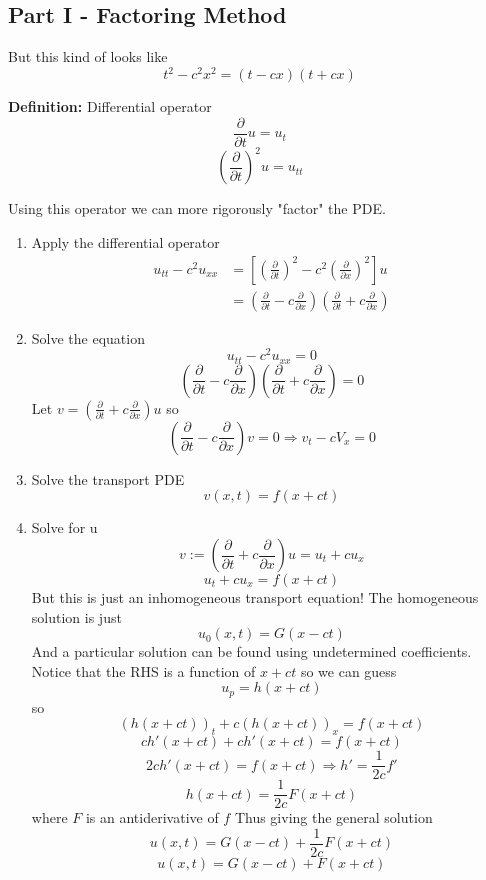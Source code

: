 \documentclass[12pt]{article}
\begin{document}
\subsection*{Part I - Factoring Method}
But this kind of looks like 
\[t^2 - c^2 x^2 = (t - cx)(t + cx)\]

\textbf{Definition:} Differential operator
\[\frac{\partial}{\partial t} u = u_t\]
\[\left(\frac{\partial}{\partial t}\right)^2 u = u_{tt}\]

Using this operator we can more rigorously "factor" the PDE.

\begin{enumerate}
    \item Apply the differential operator 
    \begin{align*}
        u_{tt} - c^2 u_{xx} &= \left[\left(\frac{\partial}{\partial t}\right)^2 - c^2 \left(\frac{\partial}{\partial x}\right)^2\right]u\\
        &= \left(\frac{\partial}{\partial t} - c \frac{\partial}{\partial x}\right)\left(\frac{\partial}{\partial t} + c \frac{\partial}{\partial x}\right)
    \end{align*}
    \item Solve the equation 
    \[u_{tt} - c^2 u_{xx} = 0\]
    \[\left(\frac{\partial}{\partial t} - c \frac{\partial}{\partial x}\right)\left(\frac{\partial}{\partial t} + c \frac{\partial}{\partial x}\right) = 0\]
    Let $v = \left(\frac{\partial}{\partial t} + c \frac{\partial}{\partial x}\right)u$ 
    so 
    \[\left(\frac{\partial}{\partial t} - c \frac{\partial}{\partial x}\right)v = 0 \Longrightarrow v_t - cV_x = 0\]
    \item Solve the transport PDE 
    \[v(x, t) = f(x + ct)\]
    \item Solve for u 
    \[v := \left(\frac{\partial}{\partial t} + c \frac{\partial}{\partial x}\right)u = u_t + cu_x\]
    \[u_t + cu_x = f(x + ct)\]
    But this is just an inhomogeneous transport equation! 
    The homogeneous solution is just 
    \[u_0(x, t)= G(x - ct)\]
    And a particular solution can be found using undetermined coefficients. Notice that the RHS is a function of $x +ct$ so we can guess 
    \[u_p = h(x + ct)\]
    so 
    \[(h(x + ct))_t + c(h(x + ct))_x = f(x + ct)\]
    \[ch'(x+ ct) + ch'(x + ct) = f(x + ct)\]
    \[2ch'(x + ct) = f(x + ct) \Longrightarrow h' = \frac{1}{2c}f'\]
    \[h(x + ct) = \frac{1}{2c}F(x + ct)\]
    where $F$ is an antiderivative of $f$
    Thus giving the general solution
    \[u(x, t)= G(x - ct) + \frac{1}{2c}F(x + ct) \]
    \[\boxed{u(x, t) = G(x - ct) + F(x + ct)}\]
\end{enumerate}
\end{document}
